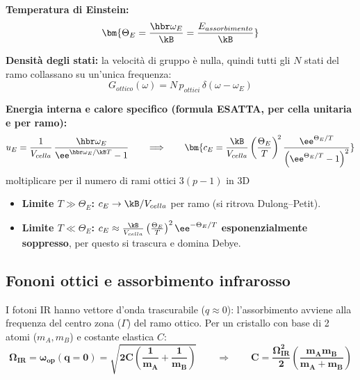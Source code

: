 \noindent\textbf{Temperatura di Einstein:}
\[ \bm{\Theta_E = \frac{\hbr\omega_E}{\kB} = \frac{E_{assorbimento}}{\kB}} \]

\noindent\textbf{Densità degli stati:} la velocità di gruppo è nulla, quindi tutti gli $N$ stati del ramo collassano su un'unica frequenza:
\[ G_{ottico}(\omega) = N\,p_{ottici}\,\delta(\omega-\omega_E) \]

\noindent\textbf{Energia interna e calore specifico (formula ESATTA, per cella unitaria e per ramo):}
\[ u_E = \frac{1}{V_{cella}}\,\frac{\hbr\omega_E}{\ee^{\hbr\omega_E/\kB T}-1}
   \qquad\Longrightarrow\qquad
   \bm{c_E = \frac{\kB}{V_{cella}}\left(\frac{\Theta_E}{T}\right)^{\!2}
        \frac{\ee^{\Theta_E/T}}{\left(\ee^{\Theta_E/T}-1\right)^{2}}} \]
moltiplicare per il numero di rami ottici $3(p-1)$ in 3D
\begin{itemize}
  \item \textbf{Limite $T\gg\Theta_E$:} $c_E \to \kB/V_{cella}$ per ramo (si ritrova Dulong--Petit).
  \item \textbf{Limite $T\ll\Theta_E$:} $c_E \approx \frac{\kB}{V_{cella}}\left(\frac{\Theta_E}{T}\right)^2\ee^{-\Theta_E/T}$ \textbf{esponenzialmente soppresso}, per questo si trascura e domina Debye.
\end{itemize}



\subsection{Fononi ottici e assorbimento infrarosso}
I fotoni IR hanno vettore d'onda trascurabile ($q\approx0$): l'assorbimento avviene alla frequenza del centro zona ($\Gamma$) del ramo ottico. Per un cristallo con base di 2 atomi ($m_A, m_B$) e costante elastica $C$:
\[ \bm{\Omega_{IR} = \omega_{op}(q=0) = \sqrt{2C\left(\frac{1}{m_A}+\frac{1}{m_B}\right)}}
   \qquad\Longrightarrow\qquad
   \bm{C = \frac{\Omega_{IR}^2}{2}\left(\frac{m_A m_B}{m_A+m_B}\right)} \]

